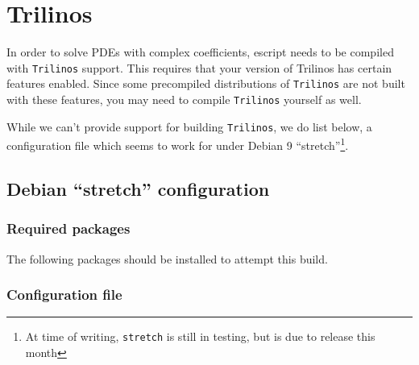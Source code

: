 \chapter{Trilinos}
\label{app:trilinos}

In order to solve PDEs with complex coefficients, escript needs to be compiled with \texttt{Trilinos} support.
This requires that your version of Trilinos has certain features enabled.
Since some precompiled distributions of \texttt{Trilinos} are not built with these features, you may 
need to compile \texttt{Trilinos} yourself as well.

While we can't provide support for building \texttt{Trilinos}, we do list below, a configuration file which seems to work for 
under Debian 9 ``stretch''\footnote{At time of writing, \texttt{stretch} is still in testing, but is due to release this month}.

\section{Debian ``stretch'' configuration}


\subsection{Required packages}

The following packages should be installed to attempt this build.




\subsection{Configuration file}

